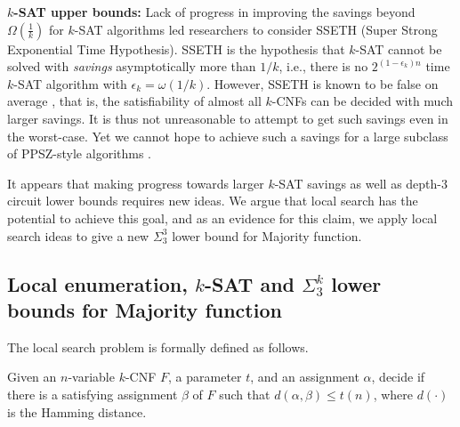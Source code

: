 

\bigskip
\noindent
{\bf $k$-SAT upper bounds:}
Lack of progress in improving the savings beyond $\Omega(\frac{1}{k})$
for $k$-SAT algorithms led researchers to consider
SSETH (Super Strong Exponential Time Hypothesis).
SSETH is the hypothesis that $k$-SAT cannot be solved with \emph{savings} asymptotically 
more than $1/k$, i.e., 
there is no $2^{(1 - \epsilon_k)n}$ time $k$-SAT 
algorithm with $\epsilon_k = \omega(1/k)$. 
However, SSETH is known to be 
false on average \cite{DBLP:conf/sat/VyasW19,LincolnY20}, 
that is, 
the satisfiability of almost all $k$-CNFs can be decided with 
much larger savings. 
It is thus not unreasonable to attempt to get such savings 
even in the worst-case. 
Yet we cannot hope to achieve such a savings for 
a large subclass of PPSZ-style algorithms \cite{DBLP:conf/coco/SchederT20}.

\bigskip
It appears that making progress towards larger $k$-SAT savings as well as depth-3 circuit lower bounds requires new ideas. We argue that local search has the potential to achieve this goal, and as an evidence for this claim, we apply local search ideas to give a new $\Sigma^3_3$ lower bound for Majority function.


\subsection{Local enumeration, $k$-SAT and $\Sigma^k_3$ lower bounds for Majority function}
The local search problem is formally defined as follows.

\bigskip
{} Given an $n$-variable $k$-CNF $F$, a parameter $t$, and an assignment $\alpha$, decide if there is a satisfying assignment $\beta$ of $F$ such that $d(\alpha, \beta) \le t(n)$, where $d(\cdot)$ is the Hamming distance.

